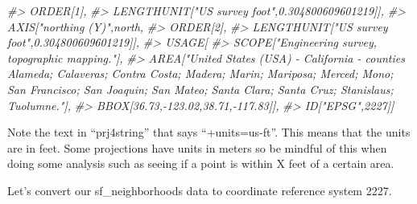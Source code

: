 \documentclass[
  12pt,
  openany]{book}
\newenvironment{Shaded}{\begin{snugshade}}{\end{snugshade}}
\newcommand{\CommentTok}[1]{\textcolor[rgb]{0.37,0.37,0.37}{\textit{#1}}}
\begin{document}
\begin{Shaded}
\begin{Highlighting}[]
\CommentTok{\#\textgreater{}             ORDER[1],}
\CommentTok{\#\textgreater{}             LENGTHUNIT["US survey foot",0.304800609601219]],}
\CommentTok{\#\textgreater{}         AXIS["northing (Y)",north,}
\CommentTok{\#\textgreater{}             ORDER[2],}
\CommentTok{\#\textgreater{}             LENGTHUNIT["US survey foot",0.304800609601219]],}
\CommentTok{\#\textgreater{}     USAGE[}
\CommentTok{\#\textgreater{}         SCOPE["Engineering survey, topographic mapping."],}
\CommentTok{\#\textgreater{}         AREA["United States (USA) {-} California {-} counties Alameda; Calaveras; Contra Costa; Madera; Marin; Mariposa; Merced; Mono; San Francisco; San Joaquin; San Mateo; Santa Clara; Santa Cruz; Stanislaus; Tuolumne."],}
\CommentTok{\#\textgreater{}         BBOX[36.73,{-}123.02,38.71,{-}117.83]],}
\CommentTok{\#\textgreater{}     ID["EPSG",2227]]}
\end{Highlighting}
\end{Shaded}

Note the text in ``prj4string'' that says ``+units=us-ft''. This means that the units are in feet. Some projections have units in meters so be mindful of this when doing some analysis such as seeing if a point is within X feet of a certain area.

Let's convert our sf\_neighborhoods data to coordinate reference system 2227.
\end{document}
